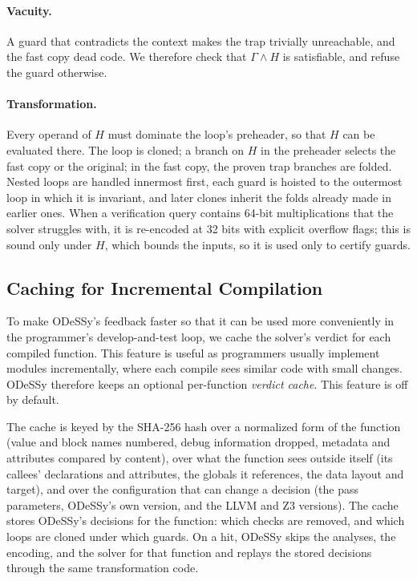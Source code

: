 \documentclass[acmsmall,screen,nonacm]{acmart}
\newcommand{\odessy}{ODeSSy}
\newcommand{\tool}{\odessy}
\begin{document}
\paragraph{Vacuity.} A guard that contradicts the context makes the trap
trivially unreachable, and the fast copy dead code. We therefore check
that $\Gamma \wedge H$ is satisfiable, and refuse the guard otherwise.

\paragraph{Transformation.} Every operand of $H$ must dominate the
loop's preheader, so that $H$ can be evaluated there. The loop is
cloned; a branch on $H$ in the preheader selects the fast copy or the
original; in the fast copy, the proven trap branches are folded. Nested
loops are handled innermost first, each guard is hoisted to the
outermost loop in which it is invariant, and later clones inherit the
folds already made in earlier ones. When a verification query contains
64-bit multiplications that the solver struggles with, it is re-encoded
at 32 bits with explicit overflow flags; this is sound only under $H$,
which bounds the inputs, so it is used only to certify guards.

\subsection{Caching for Incremental Compilation}
\label{sec:cache}
To make \tool{}'s feedback faster so that it can be used more conveniently in the programmer's develop-and-test loop, we cache the solver's verdict for each compiled function. This feature is useful as programmers usually implement modules incrementally, where each compile sees similar code with small changes. \tool{}
therefore keeps an optional per-function \emph{verdict cache}. This feature is off by default.

The cache is keyed by the SHA-256 hash over a normalized form of the function (value and block names
numbered, debug information dropped, metadata and attributes compared by
content), over what the function sees outside itself (its callees'
declarations and attributes, the globals it references, the data layout and
target), and over the configuration that can change a decision (the pass
parameters, \tool{}'s own version, and the LLVM and Z3 versions). The cache
stores \tool{}'s decisions for the function: which checks
are removed, and which loops are cloned under which guards. On a hit,
\tool{} skips the analyses, the encoding, and the solver for that function
and replays the stored decisions through the same transformation code.
\end{document}

